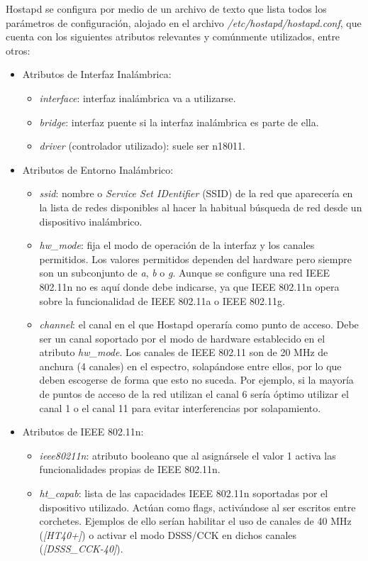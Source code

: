 Hostapd se configura por medio de un archivo de texto que lista todos los parámetros de configuración, alojado en el archivo \emph{/etc/hostapd/hostapd.conf}, que cuenta con los siguientes atributos relevantes y comúnmente utilizados, entre otros:
\begin{itemize}
\item Atributos de Interfaz Inalámbrica:
\begin{itemize}
\item \emph{interface}: interfaz inalámbrica va a utilizarse.
\item \emph{bridge}: interfaz puente si la interfaz inalámbrica es parte de ella.
\item \emph{driver} (controlador utilizado): suele ser n18011.
\end{itemize}
\item Atributos de Entorno Inalámbrico:
\begin{itemize}
\item \emph{ssid}: nombre o \emph{Service Set IDentifier} (\acrshort{SSID}) de la red que aparecería en la lista de redes disponibles al hacer la habitual búsqueda de red desde un dispositivo inalámbrico.
\item \emph{hw\_mode}: fija el modo de operación de la interfaz y los canales permitidos. Los valores permitidos dependen del hardware pero siempre son un subconjunto de \emph{a}, \emph{b} o \emph{g}. Aunque se configure una red \acrshort{IEEE} 802.11n no es aquí donde debe indicarse, ya que \acrshort{IEEE} 802.11n opera sobre la funcionalidad de \acrshort{IEEE} 802.11a o \acrshort{IEEE} 802.11g.
\item \emph{channel}: el canal en el que Hostapd operaría como punto de acceso. Debe ser un canal soportado por el modo de hardware establecido en el atributo \emph{hw\_mode}. Los canales de \acrshort{IEEE} 802.11 son de 20 MHz de anchura (4 canales) en el espectro, solapándose entre ellos, por lo que deben escogerse de forma que esto no suceda. Por ejemplo, si la mayoría de puntos de acceso de la red utilizan el canal 6 sería óptimo utilizar el canal 1 o el canal 11 para evitar interferencias por solapamiento.
\end{itemize}
\item Atributos de \acrshort{IEEE} 802.11n:
\begin{itemize}
\item \emph{ieee80211n}: atributo booleano que al asignársele el valor 1 activa las funcionalidades propias de \acrshort{IEEE} 802.11n.
\item \emph{ht\_capab}: lista de las capacidades \acrshort{IEEE} 802.11n soportadas por el dispositivo utilizado. Actúan como flags, activándose al ser escritos entre corchetes. Ejemplos de ello serían habilitar el uso de canales de 40 MHz (\emph{[HT40+]}) o activar el modo \acrshort{DSSS}/\acrshort{CCK} en dichos canales (\emph{[DSSS\_CCK-40]}).

\end{itemize}
\end{itemize}
